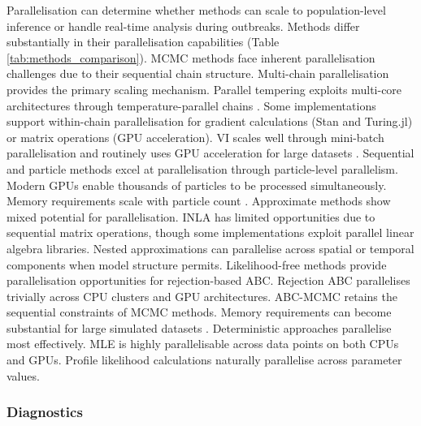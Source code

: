 \documentclass{article}
\begin{document}
Parallelisation can determine whether methods can scale to population-level inference or handle real-time analysis during outbreaks.
Methods differ substantially in their parallelisation capabilities (Table \ref{tab:methods_comparison}).
\ac{MCMC} methods face inherent parallelisation challenges due to their sequential chain structure.
Multi-chain parallelisation provides the primary scaling mechanism.
Parallel tempering exploits multi-core architectures through temperature-parallel chains \citep{surjanovic2023pigeons}.
Some implementations support within-chain parallelisation for gradient calculations (Stan and Turing.jl) or matrix operations (\ac{GPU} acceleration).
\ac{VI} scales well through mini-batch parallelisation and routinely uses \ac{GPU} acceleration for large datasets \citep{hoffman2013stochastic, Abbott2021-delta}.
Sequential and particle methods excel at parallelisation through particle-level parallelism.
Modern \ac{GPU}s enable thousands of particles to be processed simultaneously.
Memory requirements scale with particle count \citep{henriksen2012parallel}.
Approximate methods show mixed potential for parallelisation.
\ac{INLA} has limited opportunities due to sequential matrix operations, though some implementations exploit parallel linear algebra libraries.
Nested approximations can parallelise across spatial or temporal components when model structure permits.
Likelihood-free methods provide parallelisation opportunities for rejection-based \ac{ABC}.
Rejection \ac{ABC} parallelises trivially across \ac{CPU} clusters and \ac{GPU} architectures.
\ac{ABC}-\ac{MCMC} retains the sequential constraints of \ac{MCMC} methods.
Memory requirements can become substantial for large simulated datasets \citep{kulkarni2022hardware}.
Deterministic approaches parallelise most effectively.
\ac{MLE} is highly parallelisable across data points on both \ac{CPU}s and \ac{GPU}s.
Profile likelihood calculations naturally parallelise across parameter values.

\subsubsection{Diagnostics}
\end{document}
